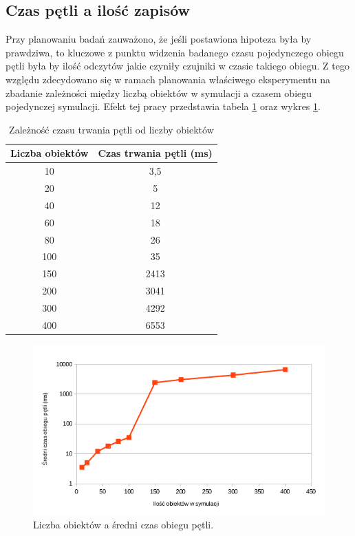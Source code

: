 \subsection{Czas pętli a ilość zapisów}
\par{
Przy planowaniu badań zauważono, że jeśli postawiona hipoteza była by prawdziwa, to kluczowe z punktu widzenia badanego czasu pojedynczego obiegu pętli była by ilość odczytów jakie czyniły czujniki w czasie takiego obiegu. Z tego względu zdecydowano się w ramach planowania właściwego eksperymentu na zbadanie zależności między liczbą obiektów w symulacji a czasem obiegu pojedynczej symulacji. Efekt tej pracy przedstawia tabela \ref{ex_1} oraz wykres \ref{ex_1_chart}.
}
\par{
\begin{table}[t]
\caption{Zależność czasu trwania pętli od liczby obiektów}
\label{ex_1}
\begin{center}
\begin{tabular}{|c|c|}
  \hline 
 \textbf{Liczba obiektów} & \textbf{Czas trwania pętli (ms)} \\
  \hline
  10 & 3,5 \\
  20	 & 5 \\
  40	 & 12 \\
  60	 & 18 \\
  80	 & 26 \\
  100 & 35 \\
  150 & 2413 \\
  200 & 3041 \\
  300 & 4292 \\
  400 & 6553 \\
  \hline  
\end{tabular}
\end{center}
\end{table}
}

\begin{figure}[htb]
    \begin{center}
	\includegraphics[width=\textwidth,keepaspectratio]{img/wykres_1}
	\caption{Liczba obiektów a średni czas obiegu pętli.}
	\label{ex_1_chart}
    \end{center}
\end{figure}


